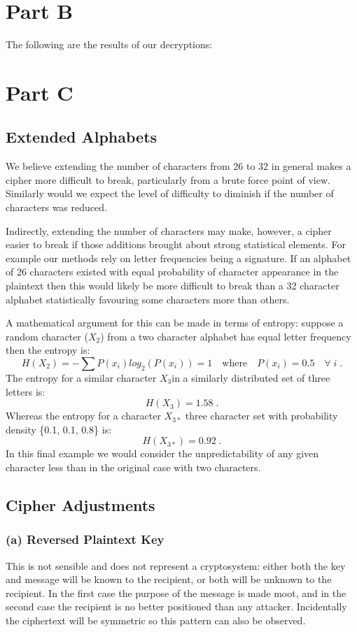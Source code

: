 \documentclass{book}%
\begin{document}


\section*{Part B}

The following are the results of our decryptions:

\section*{Part C}
\subsection*{Extended Alphabets}
We believe extending the number of characters from 26 to 32 in general makes a cipher more difficult to break, particularly from a brute force point of view. Similarly would we expect the level of difficulty to diminish if the number of characters was reduced.
\par Indirectly, extending the number of characters may make, however, a cipher easier to break if those additions brought about strong statistical elements. For example our methods rely on letter frequencies being a signature. If an alphabet of 26 characters existed with equal probability of character appearance in the plaintext then this would likely be more difficult to break than a 32 character alphabet statistically favouring some characters more than others.
\par A mathematical argument for this can be made in terms of entropy: suppose a random character (\(X_2\)) from a two character alphabet has equal letter frequency then the entropy is:
\[ H(X_2) = -\sum P(x_i)log_2(P(x_i)) = 1 \quad \text{where} \quad P(x_i)=0.5 \quad \forall \; i \;.\]
The entropy for a similar character \(X_3\)in a similarly distributed set of three letters is:
\[ H(X_3) = 1.58 \;.\]
Whereas the entropy for a character \(X_{3*}\) three character set with probability density \{0.1, 0.1, 0.8\} is:
\[ H(X_{3*}) = 0.92 \;. \]
In this final example we would consider the unpredictability of any given character less than in the original case with two characters.

\subsection*{Cipher Adjustments}
\subsubsection*{(a) Reversed Plaintext Key}
This is not sensible and does not represent a cryptosystem: either both the key and message will be known to the recipient, or both will be unknown to the recipient. In the first case the purpose of the message is made moot, and in the second case the recipient is no better positioned than any attacker. Incidentally the ciphertext will be symmetric so this pattern can also be observed.
\end{document}
